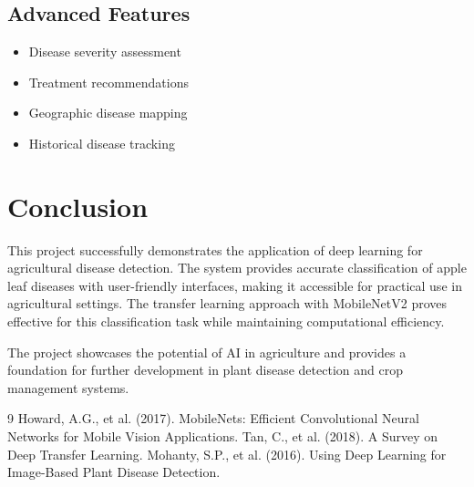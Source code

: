\documentclass[12pt,a4paper]{article}
\begin{document}
\subsection{Advanced Features}
\begin{itemize}
    \item Disease severity assessment
    \item Treatment recommendations
    \item Geographic disease mapping
    \item Historical disease tracking
\end{itemize}

\section{Conclusion}

This project successfully demonstrates the application of deep learning for agricultural disease detection. The system provides accurate classification of apple leaf diseases with user-friendly interfaces, making it accessible for practical use in agricultural settings. The transfer learning approach with MobileNetV2 proves effective for this classification task while maintaining computational efficiency.

The project showcases the potential of AI in agriculture and provides a foundation for further development in plant disease detection and crop management systems.

\begin{thebibliography}{9}
 Howard, A.G., et al. (2017). MobileNets: Efficient Convolutional Neural Networks for Mobile Vision Applications.
 Tan, C., et al. (2018). A Survey on Deep Transfer Learning.
 Mohanty, S.P., et al. (2016). Using Deep Learning for Image-Based Plant Disease Detection.
\end{thebibliography}
\end{document}
